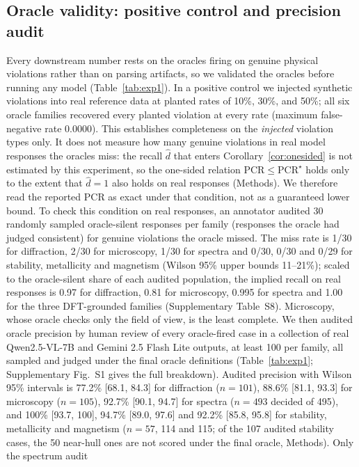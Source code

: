 \documentclass[pdflatex,sn-nature]{sn-jnl}
\newcommand{\rev}[1]{#1}
\newcommand{\rev}[1]{{\color{blue}#1}}
\begin{document}
\subsection*{Oracle validity: positive control and precision audit}
\rev{Every downstream number rests on the oracles firing on genuine physical violations
rather than on parsing artifacts, so we validated the oracles before running any model
(Table~\ref{tab:exp1}). In a positive control we injected synthetic violations into real
reference data at planted rates of 10\%, 30\%, and 50\%; all six oracle families recovered
every planted violation at every rate (maximum false-negative rate 0.0000). This establishes
completeness on the \emph{injected} violation types only. It does not measure how many genuine
violations in real model responses the oracles miss: the recall $\hat d$ that enters
Corollary~\ref{cor:onesided} is not estimated by this experiment, so the one-sided relation
$\mathrm{PCR}\le\mathrm{PCR}^\star$ holds only to the extent that $\hat d=1$ also holds on real
responses (Methods). We therefore read the reported PCR as exact under that condition, not as a
guaranteed lower bound. To check this condition on real responses, an annotator audited 30 randomly
sampled oracle-silent responses per family (responses the oracle had judged consistent) for genuine
violations the oracle missed. The miss rate is 1/30 for diffraction, 2/30 for microscopy, 1/30 for spectra
and 0/30, 0/30 and 0/29 for stability, metallicity and magnetism (Wilson 95\% upper bounds 11--21\%);
scaled to the oracle-silent share of each audited population, the implied recall on real responses is
0.97 for diffraction, 0.81 for microscopy, 0.995 for spectra and 1.00 for the three DFT-grounded families
(Supplementary Table~S8). Microscopy, whose oracle checks only the field of view, is the least complete. We then audited oracle precision by human review of every oracle-fired
case in a collection of real Qwen2.5-VL-7B and Gemini 2.5 Flash Lite outputs, at least 100 per
family, all sampled and judged under the final oracle definitions (Table~\ref{tab:exp1};
Supplementary Fig.~S1 gives the full breakdown). Audited precision with Wilson 95\% intervals is 77.2\% [68.1, 84.3] for diffraction
($n=101$), 88.6\% [81.1, 93.3] for microscopy ($n=105$), 92.7\% [90.1, 94.7] for spectra
($n=493$ decided of 495), and 100\% [93.7, 100], 94.7\% [89.0, 97.6] and 92.2\% [85.8, 95.8]
for stability, metallicity and magnetism ($n=57$, 114 and 115; of the 107 audited stability cases,
the 50 near-hull ones are not scored under the final oracle, Methods). Only the spectrum audit
}
\end{document}
